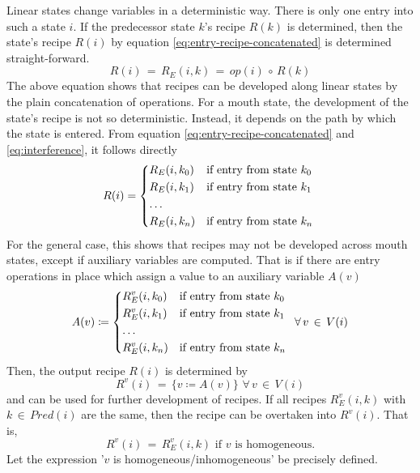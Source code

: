 \documentclass[12pt,a4paper]{scrartcl}
\begin{document}
Linear states change variables in a deterministic way. There is only one entry
into such a state $i$. If the predecessor state $k$'s recipe $R(k)$ is
determined, then the state's recipe $R(i)$ by equation \eqref{eq:entry-recipe-concatenated} 
is determined straight-forward.
\begin{equation} \label{eq:linear-state-recipe}
    R(i) \,=\,R_E(i,k) \,=\, op(i)\,\circ\,R(k)
\end{equation}
The above equation shows that recipes can be developed along linear states by
the plain concatenation of operations.  For a mouth state, the development of the
state's recipe is not so deterministic.  Instead, it depends on the path by
which the state is entered.  From equation \eqref{eq:entry-recipe-concatenated}
and \eqref{eq:interference}, it follows directly
\begin{equation} \label{eq:mouth-state-recipe}
    R(i) = \begin{dcases*}
             R_E(i,k_0) & if entry from state $k_0$ \\
             R_E(i,k_1) & if entry from state $k_1$ \\
             \ldots \\
             R_E(i,k_n) & if entry from state $k_n$ \\
            \end{dcases*}
\end{equation}
For the general case, this shows that recipes may not be developed across
mouth states, except if auxiliary variables are computed. That is if there
are entry operations in place which assign a value to an auxiliary variable $A(v)$
\begin{equation}
    A(v) \coloneqq   \begin{dcases*}
             R^v_E(i,k_0) & if entry from state $k_0$ \\
             R^v_E(i,k_1) & if entry from state $k_1$ \\
             \ldots \\
             R^v_E(i,k_n) & if entry from state $k_n$ \\
            \end{dcases*}
            \,\forall\,v\,\in\,V(i)
\end{equation}
Then, the output recipe $R(i)$ is determined by
\begin{equation}
    R^v(i) \,=\, \{ v \coloneqq A(v) \}\,\,\forall\,v\,\in\,V(i)
\end{equation}
and can be used for further development of recipes. If all recipes $R^v_E(i,k)$
with $k\,\in\,Pred(i)$ are the same, then the recipe can be overtaken into
$R^v(i)$. That is,
\begin{equation}
    R^v(i) \,=\, R^v_E(i,k)\,\,\mbox{if $v$ is homogeneous}.
\end{equation}
Let the expression '$v$ is homogeneous/inhomogeneous' be precisely defined.
\end{document}
